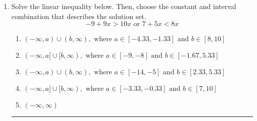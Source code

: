\documentclass[14pt]{extbook}
\newcommand{\litem}[1]{\item#1\hspace*{-1cm}\rule{\textwidth}{0.4pt}}
\begin{document}
\begin{enumerate}
{\begin{enumerate}[label=\Alph*.]
\end{enumerate} }
\litem{
Solve the linear inequality below. Then, choose the constant and interval combination that describes the solution set.\[ -9 + 9 x > 10 x \text{ or } 7 + 5 x < 8 x \]\begin{enumerate}[label=\Alph*.]
\item \( (-\infty, a) \cup (b, \infty), \text{ where } a \in [-4.33, -1.33] \text{ and } b \in [8, 10] \)
\item \( (-\infty, a] \cup [b, \infty), \text{ where } a \in [-9, -8] \text{ and } b \in [-1.67, 5.33] \)
\item \( (-\infty, a) \cup (b, \infty), \text{ where } a \in [-14, -5] \text{ and } b \in [2.33, 5.33] \)
\item \( (-\infty, a] \cup [b, \infty), \text{ where } a \in [-3.33, -0.33] \text{ and } b \in [7, 10] \)
\item \( (-\infty, \infty) \)

\end{enumerate} }
\end{enumerate}
\end{document}
